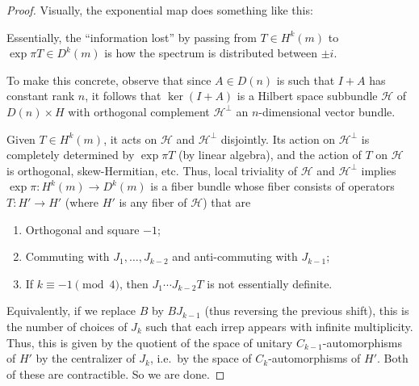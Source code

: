 \documentclass{shortart}
\theoremstyle{definition}
\begin{document}
\begin{proof}
  Visually, the exponential map does something like this:
  \begin{center}
  \end{center}
  Essentially, the ``information lost'' by passing from $T \in H^k(m)$ to $\exp \pi T \in D^k(m)$ is how the spectrum is distributed between $\pm i$.

  To make this concrete, observe that since $A \in D(n)$ is such that $I + A$ has constant rank $n$, it follows that $\ker (I + A)$ is a Hilbert space subbundle $\mathcal{H}$ of $D(n) \times H$ with orthogonal complement $\mathcal{H}^\perp$ an $n$-dimensional vector bundle.

  Given $T \in H^k(m)$, it acts on $\mathcal{H}$ and $\mathcal{H}^\perp$ disjointly. Its action on $\mathcal{H}^\perp$ is completely determined by $\exp \pi T$ (by linear algebra), and the action of $T$ on $\mathcal{H}$ is orthogonal, skew-Hermitian, etc. Thus, local triviality of $\mathcal{H}$ and $\mathcal{H}^\perp$ implies $\exp \pi: H^k(m) \to D^k(m)$ is a fiber bundle whose fiber consists of operators $T: H' \to H'$ (where $H'$ is any fiber of $\mathcal{H}$) that are
  \begin{enumerate}
    \item Orthogonal and square $-1$;
    \item Commuting with $J_1, \ldots, J_{k - 2}$ and anti-commuting with $J_{k - 1}$;
    \item If $k \equiv -1 \pmod 4$, then $J_1 \cdots J_{k - 2} T$ is not essentially definite.
  \end{enumerate}
  Equivalently, if we replace $B$ by $BJ_{k - 1}$ (thus reversing the previous shift), this is the number of choices of $J_k$ such that each irrep appears with infinite multiplicity. Thus, this is given by the quotient of the space of unitary $C_{k - 1}$-automorphisms of $H'$ by the centralizer of $J_k$, i.e.\ by the space of $C_k$-automorphisms of $H'$. Both of these are contractible. So we are done.
\end{proof}
\end{document}
